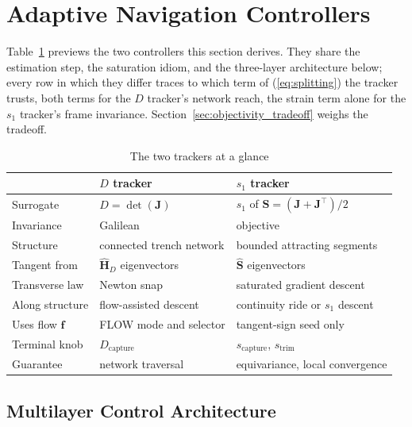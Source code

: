 \documentclass[lettersize,journal]{IEEEtran}
\begin{document}
\section{Adaptive Navigation Controllers}
\label{sec:controllers}

Table~\ref{tab:trackers} previews the two controllers this section
derives. They share the estimation step, the saturation idiom, and the
three-layer architecture below; every row in which they differ traces
to which term of (\ref{eq:splitting}) the tracker trusts, both terms
for the $D$ tracker's network reach, the strain term alone for
the $s_1$ tracker's frame invariance.
Section~\ref{sec:objectivity_tradeoff} weighs the tradeoff.

\begin{table}[!t]
\centering
\caption{The two trackers at a glance}
\label{tab:trackers}
\footnotesize
\setlength{\tabcolsep}{3pt}
\begin{tabular}{lll}
\hline
 & \textbf{$D$ tracker} & \textbf{$s_1$ tracker} \\
\hline
Surrogate & $D = \det(\mathbf{J})$ & $s_1$ of $\mathbf{S} = (\mathbf{J}+\mathbf{J}^\top)/2$ \\
Invariance & Galilean & objective \\
Structure & connected trench network & bounded attracting segments \\
Tangent from & $\hat{\mathbf{H}}_D$ eigenvectors & $\hat{\mathbf{S}}$ eigenvectors \\
Transverse law & Newton snap & saturated gradient descent \\
Along structure & flow-assisted descent & continuity ride or $s_1$ descent \\
Uses flow $\mathbf{f}$ & FLOW mode and selector & tangent-sign seed only \\
Terminal knob & $D_{\text{capture}}$ & $s_{\text{capture}}$, $s_{\text{trim}}$ \\
Guarantee & network traversal & equivariance, local convergence \\
\hline
\end{tabular}
\end{table}

\subsection{Multilayer Control Architecture}
\label{sec:arch}
\end{document}
